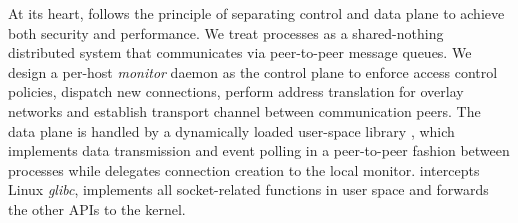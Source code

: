 


At its heart, \sys{} follows the principle of separating control and data plane to achieve both security and performance. We treat processes as a shared-nothing distributed system that communicates via peer-to-peer message queues.
We design a per-host \emph{monitor} daemon as the control plane to enforce access control policies, dispatch new connections, perform address translation for overlay networks and establish transport channel between communication peers.
The data plane is handled by a dynamically loaded user-space library \libipc{}, which implements data transmission and event polling in a peer-to-peer fashion between processes while delegates connection creation to the local monitor.
\libipc{} intercepts Linux \emph{glibc}, implements all socket-related functions in user space and forwards the other APIs to the kernel.



